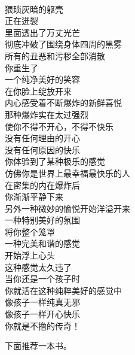 \begin{adjustwidth}{-1em}{-1em}
    \begin{poem}[不撸的传奇]
        \begin{multicols}{3}
            \centering~\\
            猥琐灰暗的躯壳 \\ 正在迸裂 \\ 里面透出了万丈光芒 \\ 彻底冲破了围绕身体四周的黑雾 \\ 所有的丑恶和污秽全部消散 \\ 你重生了 \\ 一个纯净美好的笑容 \\ 在你脸上绽放开来 \\ 内心感受着不断爆炸的新鲜喜悦 \\ 那种爆炸实在太过强烈 \\ 使你不得不开心，不得不快乐 \\ 没有任何理由的开心 \\ 没有任何原因的快乐 \\ 你体验到了某种极乐的感觉 \\ 仿佛你是世界上最幸福最快乐的人 \\ 在密集的内在爆炸后 \\ 你渐渐平静下来 \\ 另外一种微妙的愉悦开始洋溢开来 \\ 一种特别美好的氛围 \\ 将你整个笼罩 \\ 一种完美和谐的感觉 \\ 开始浮上心头 \\ 这种感觉太久违了 \\ 当你还是一个孩子时 \\ 你就活在这种纯粹美好的感觉中 \\ 像孩子一样纯真无邪 \\ 像孩子一样开心快乐 \\ 你就是不撸的传奇！
        \end{multicols}
    \end{poem}
\end{adjustwidth}

下面推荐一本书。

